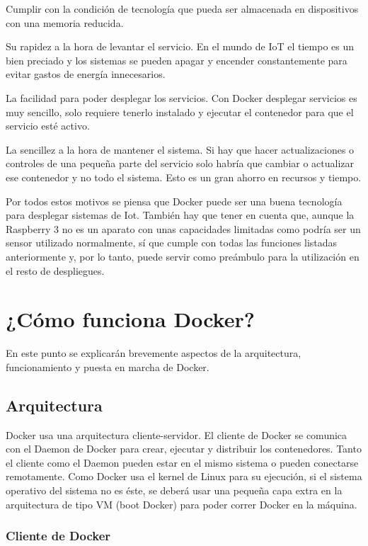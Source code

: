 Cumplir con la condición de tecnología que pueda ser almacenada en dispositivos con una memoria reducida.

Su rapidez a la hora de levantar el servicio. En el mundo de IoT el tiempo es un bien
preciado y los sistemas se pueden apagar y encender constantemente para evitar gastos de energía innecesarios.

La facilidad para poder desplegar los servicios. Con Docker desplegar servicios es muy sencillo, solo requiere tenerlo instalado y ejecutar el contenedor para que el servicio esté activo.

La sencillez a la hora de mantener el sistema. Si hay que hacer actualizaciones o controles de una pequeña parte del servicio solo habría que cambiar o actualizar ese contenedor y no todo el sistema. Esto es un gran ahorro en recursos y tiempo. 

Por todos estos motivos se piensa que Docker puede ser una buena tecnología para desplegar sistemas de Iot. También hay que tener en cuenta que, aunque la Raspberry 3 no es un aparato con unas capacidades limitadas como podría ser un sensor utilizado normalmente, sí que cumple con todas las funciones listadas anteriormente y, por lo tanto, puede servir como preámbulo para la utilización en el resto de despliegues.  

\section{¿Cómo funciona Docker?}

En este punto se explicarán brevemente aspectos de la arquitectura, funcionamiento y
puesta en marcha de Docker.  

\subsection{Arquitectura}

Docker usa una arquitectura cliente-servidor. El cliente de Docker se comunica con el
Daemon de Docker para crear, ejecutar y distribuir los contenedores. Tanto el cliente como el Daemon pueden estar en el mismo sistema o pueden conectarse remotamente.
Como Docker usa el kernel de Linux para su ejecución, si el sistema operativo del sistema no es éste, se deberá usar una pequeña capa extra en la arquitectura de tipo VM (boot Docker) para poder correr Docker en la máquina.

\subsubsection{Cliente de Docker}

